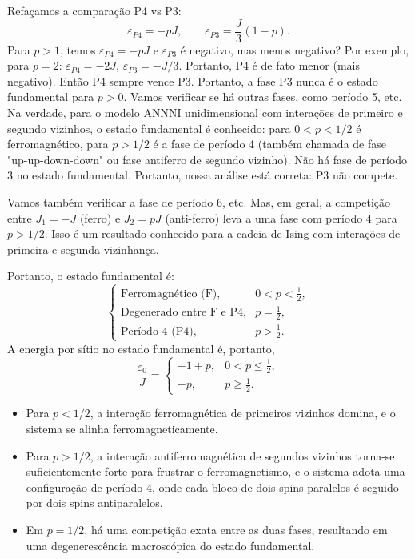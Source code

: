 \documentclass[11pt,a4paper]{article}
\begin{document}
\begin{itemize}
\begin{itemize}
    Refaçamos a comparação P4 vs P3:
    \[
    \varepsilon_{P4} = -pJ, \qquad \varepsilon_{P3} = \frac{J}{3}(1-p).
    \]
    Para \(p > 1\), temos \(\varepsilon_{P4} = -pJ\) e \(\varepsilon_{P3}\) é negativo, mas menos negativo? Por exemplo, para \(p = 2\): \(\varepsilon_{P4} = -2J\), \(\varepsilon_{P3} = -J/3\). Portanto, P4 é de fato menor (mais negativo). Então P4 sempre vence P3. Portanto, a fase P3 nunca é o estado fundamental para \(p>0\). Vamos verificar se há outras fases, como período 5, etc. Na verdade, para o modelo ANNNI unidimensional com interações de primeiro e segundo vizinhos, o estado fundamental é conhecido: para \(0 < p < 1/2\) é ferromagnético, para \(p > 1/2\) é a fase de período 4 (também chamada de fase "up-up-down-down" ou fase antiferro de segundo vizinho). Não há fase de período 3 no estado fundamental. Portanto, nossa análise está correta: P3 não compete.

    Vamos também verificar a fase de período 6, etc. Mas, em geral, a competição entre \(J_1 = -J\) (ferro) e \(J_2 = pJ\) (anti-ferro) leva a uma fase com período 4 para \(p > 1/2\). Isso é um resultado conhecido para a cadeia de Ising com interações de primeira e segunda vizinhança.
\end{itemize}
%
\end{itemize}
%
Portanto, o estado fundamental é:
%
\begin{equation}
    \boxed{
    \begin{cases}
        \text{Ferromagnético (F)}, & 0 < p < \frac{1}{2}, \\[4pt]
        \text{Degenerado entre F e P4}, & p = \frac{1}{2}, \\[4pt]
        \text{Período 4 (P4)}, & p > \frac{1}{2}.
    \end{cases}
    }
    \label{eq:gs_annni}
\end{equation}
%
A energia por sítio no estado fundamental é, portanto,
%
\begin{equation}
    \frac{\varepsilon_0}{J} =
    \begin{cases}
        -1 + p, & 0 < p \leq \frac{1}{2}, \\[4pt]
        -p, & p \geq \frac{1}{2}.
    \end{cases}
    \label{eq:eps0_annni}
\end{equation}
%
\begin{itemize}
    \item Para \(p < 1/2\), a interação ferromagnética de primeiros vizinhos domina, e o sistema se alinha ferromagneticamente.
    \item Para \(p > 1/2\), a interação antiferromagnética de segundos vizinhos torna-se suficientemente forte para frustrar o ferromagnetismo, e o sistema adota uma configuração de período 4, onde cada bloco de dois spins paralelos é seguido por dois spins antiparalelos.
    \item Em \(p = 1/2\), há uma competição exata entre as duas fases, resultando em uma degenerescência macroscópica do estado fundamental.
\end{itemize}
\end{document}
